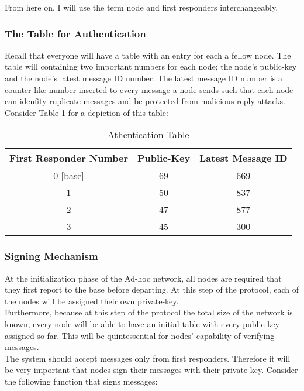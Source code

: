 \documentclass[letterpaper]{article}
\begin{document}
\begin{enumerate}
From here on, I will use the term node and first responders interchangeably.

\subsubsection{The Table for Authentication}
Recall that everyone will have a table with an entry for each a fellow node. The table will containing two important numbers for each node; the node's public-key and the node's latest message ID number. The latest message ID number is a counter-like number inserted to every message a node sends such that each node can idenfity ruplicate messages and be protected from malicious reply attacks. Consider Table 1 for a depiction of this table:

\begin{table}[ht]
\caption{Athentication Table} %
\centering %
\begin{tabular}{c c c } %
\hline
\hline %
First Responder Number & Public-Key & Latest Message ID  \\[0.5ex] %
\hline %
0 [base] & 69 & 669\\
1 & 50 & 837\\
2 & 47 & 877 \\
3 & 45 & 300\\ [1ex]
\hline
\end{tabular}
\label{table:nonlin}
\end{table}

\subsubsection{Signing Mechanism}
At the initialization phase of the Ad-hoc network, all nodes are required that they first report to the base before departing. 
At this step of the protocol, each of the nodes will be assigned their own private-key. \\
Furthermore, because at this step of the protocol the total size of the network is known, every node will be able to have an initial table with every public-key assigned so far. 
This will be quintessential for nodes' capability of verifying messages.
\\
The system should accept messages only from first responders. Therefore it will be very important that nodes sign their messages with their private-key. Consider the following function that signs messages:


\end{enumerate}
\end{document}
